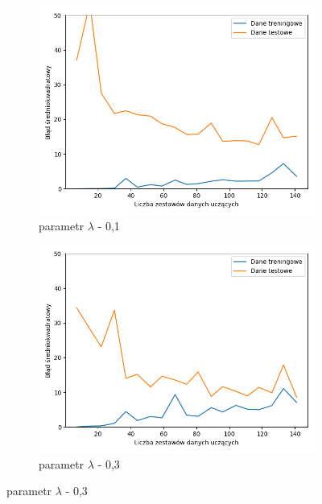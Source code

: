\documentclass[12pt]{aghdpl}
\begin{document}
		\begin{figure}[h]
			\begin{subfigure}{.5\linewidth}
		 		\includegraphics[width =\linewidth]{wykresy/7_badanie_danych/l1/regularyzacja_0_1_learning_curves.png}
		 		\caption{parametr $\lambda$ - 0,1}
		 	\end{subfigure}
		 	\begin{subfigure}{.5\linewidth}
		 		\includegraphics[width =\linewidth]{wykresy/7_badanie_danych/l1/regularyzacja_0_3_learning_curves.png}
		 		\caption{parametr $\lambda$ - 0,3}
		 	\end{subfigure}
		 	

\end{figure}
\end{document}
